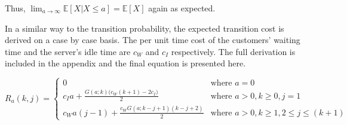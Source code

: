 Thus, $\displaystyle \lim_{a \to \infty} \mathbb{E} [X | X \leq a] = \mathbb{E} [X]$ again as expected.

In a similar way to the transition probability, the expected transition cost is derived on a case by case basis. The per unit time cost of the customers' waiting time and the server's idle time are $c_{W}$ and $c_{I}$ respectively. The full derivation is included in the appendix and the final equation is presented here.

\begin{equation}
	R_{a} (k, j) = \begin{cases} 0 & \text{where $a = 0$} \\ c_{I} a + \frac{G (a; k) \big( c_{W} (k + 1) - 2 c_{I} \big)}{2} & \text{where $a > 0, k \geq 0, j = 1$} \\ c_{W} a (j - 1) + \frac{c_{W} G (a; k - j + 1) (k - j + 2)}{2} & \text{where $a > 0, k \geq 1, 2 \leq j \leq (k + 1)$} \end{cases}
\end{equation}




































